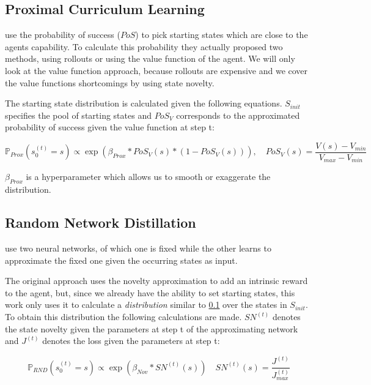 \documentclass{article}
\begin{document}
\subsection{Proximal Curriculum Learning}
\label{sec:prox_detail}
\cite{prox_curr} use the probability of success ($PoS$) to pick starting states which are close to the agents capability.
To calculate this probability they actually proposed two methods, using rollouts or using the value function of the agent. We will only look at the value function approach, because rollouts are expensive and we cover the value functions shortcomings by using state novelty.

The starting state distribution is calculated given the following equations. $S_{init}$ specifies the pool of starting states and $PoS_V$ corresponds to the approximated probability of success given the value function at step t:

\begin{equation}\label{dist:prox_curr}
  \mathbb{P}_{Prox}(s_0^{(t)} = s) \propto \exp(\beta_{Prox} * PoS_V(s) * (1 - PoS_V(s))), \quad PoS_V(s) = \frac{V(s) - V_{min}}{V_{max} - V_{min}}
\end{equation}

$\beta_{Prox}$ is a hyperparameter which allows us to smooth or exaggerate the distribution.

\subsection{Random Network Distillation}
\label{sec:rnd}
\cite{rnd} use two neural networks, of which one is fixed while the other learns to approximate the fixed one given the occurring states as input.

The original approach uses the novelty approximation to add an intrinsic reward to the agent, but, since we already have the ability to set starting states, this work only uses it to calculate a \textit{distribution} similar to \cref{sec:prox_detail} over the states in $S_{init}$.
To obtain this distribution the following calculations are made. $SN^{(t)}$ denotes the state novelty given the parameters at step t of the approximating network and $J^{(t)}$ denotes the loss given the parameters at step t:

\begin{equation}\label{dist:rnd}
  \mathbb{P}_{RND}(s_0^{(t)} = s) \propto \exp(\beta_{Nov} * SN^{(t)}(s)) \quad SN^{(t)}(s) = \frac{J^{(t)}}{J_{max}^{(t)}}
\end{equation}
\end{document}
